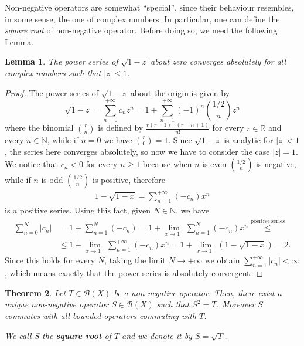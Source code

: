 \documentclass[corpo=11pt, stile=classica, tipotesi=custom,
greek, evenboxes, english]{toptesi}
\numberwithin{equation}{chapter}
\newtheorem{teo}{Theorem}[chapter] %
\newtheorem{lem}[teo]{Lemma}
\theoremstyle{remark}
\newcommand{\R}{\mathbb{R}} %
\newcommand{\N}{\mathbb{N}} %
\newcommand{\B}{\mathscr{B}} %
\begin{document}
{\color{blue}Non-negative operators are somewhat ``special'', since their behaviour resembles, in some sense, the one of complex numbers. In particular, one can define the \emph{square root} of non-negative operator. Before doing so, we need the following Lemma.}
\begin{lem}\label{power series of square root lemma}
	The power series of $\sqrt{1-z}$ about zero converges absolutely for all complex numbers such that $|z| \leq 1$.
\end{lem}
\begin{proof}
	The power series of $\sqrt{1-z}$ about the origin is given by
	\begin{equation*}
		\sqrt{1-z} = \sum_{n=0}^{+\infty}c_n z^n = 1 + \sum_{n=1}^{+\infty} (-1)^n\binom{1/2}{n} z^n
	\end{equation*}
	where the binomial $\binom{r}{n}$ is defined by $\frac{r(r-1)\cdots(r-n+1)}{n!}$ for every $r \in \R$ and every $n \in \N$, while if $n=0$ we have $\binom{r}{0}=1$. Since $\sqrt{1-z}$ is analytic for $|z|<1$, the series here converges absolutely, so now we have to consider the case $|z|=1$. We notice that $c_n < 0$ for every $n \geq 1$ because when $n$ is even $\binom{1/2}{n}$ is negative, while if $n$ is odd $\binom{1/2}{n}$ is positive, therefore
	\begin{align*}
		1-\sqrt{1-x} = \sum_{n=1}^{+\infty} (-c_n) x^n
	\end{align*}
	is a positive series. Using this fact, given $N \in \N$, we have
	\begin{align*}
		\sum_{n=0}^{N} |c_n| &= 1 + \sum_{n=1}^{N} (-c_n) = 1 + \lim_{x \rightarrow 1^-} \sum_{n=1}^{N} (-c_n)x^n \overset{\mathrm{positive\ series}}{\leq} \\
							 &\leq 1 + \lim_{x \rightarrow 1^-} \sum_{n=1}^{+\infty} (-c_n)x^n = 1 + \lim_{x \rightarrow 1^-}(1-\sqrt{1-x}) = 2.
	\end{align*}
	Since this holds for every $N$, taking the limit $N \rightarrow +\infty$ we obtain $\sum_{n=1}^{+\infty} |c_n| < \infty$, which means exactly that the power series is absolutely convergent.
\end{proof}
\begin{teo}\label{existence of square root}
	Let $T \in \B(X)$ be a non-negative operator. Then, there exist a unique non-negative operator $S \in \B(X)$ such that $S^2 = T$. Moreover $S$ commutes with all bounded operators commuting with $T$.
	
	We call $S$ the \textbf{square root} of $T$ and we denote it by $S = \sqrt{T}$.
\end{teo}
\end{document}
